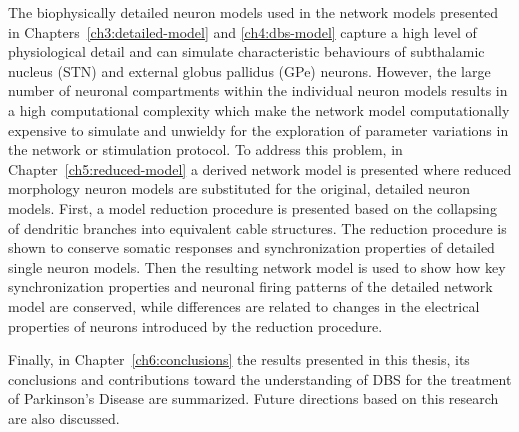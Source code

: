 %
The biophysically detailed neuron models used in the network models presented in
Chapters~\ref{ch3:detailed-model} and \ref{ch4:dbs-model} capture a high level of
physiological detail and can simulate characteristic behaviours of subthalamic nucleus
(STN) and external globus pallidus (GPe) neurons.
However, the large number of neuronal compartments within the individual neuron
models results in a high computational complexity which make the network model
computationally expensive to simulate and unwieldy for the exploration of parameter
variations in the network or stimulation protocol.
%
To address this problem, in Chapter~\ref{ch5:reduced-model} a derived network model
is presented where reduced morphology neuron models are substituted for the original,
detailed neuron models. First, a model reduction procedure is presented based on
the collapsing of dendritic branches into equivalent cable structures. The reduction
procedure is shown to conserve somatic responses and synchronization properties
of detailed single neuron models.
Then the resulting network model is used to show how key synchronization properties
and neuronal firing patterns of the detailed network model are conserved, while differences
are related to changes in the electrical properties of neurons introduced by the
reduction procedure.

%
Finally, in Chapter~\ref{ch6:conclusions} the results presented in this thesis,
its conclusions and contributions toward the understanding of DBS for the
treatment of Parkinson's Disease are summarized. Future directions based on
this research are also discussed.